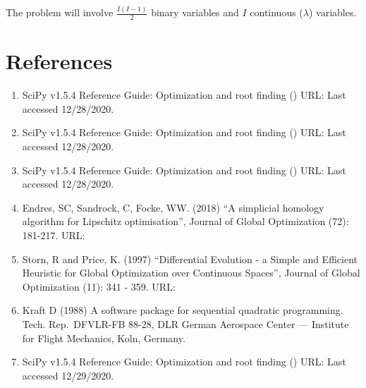 \documentclass[letterpaper,10pt,english]{sphinxmanual}
\begin{document}
The problem will involve \(\frac{I(I-1)}{2}\) binary variables and \(I\) continuous (\(\lambda\)) variables.


\section{References}
\label{\detokenize{optimizers:references}}\begin{enumerate}
\def\theenumi{\arabic{enumi}}
\def\labelenumi{\theenumi .}
\makeatletter\def\p@enumii{\p@enumi \theenumi .}\makeatother
\item {} 
 SciPy v1.5.4 Reference Guide: Optimization
and root finding () URL:
Last accessed 12/28/2020.

\item {} 
 SciPy v1.5.4 Reference
Guide: Optimization and root finding () URL:
Last accessed 12/28/2020.

\item {} 
 SciPy v1.5.4 Reference Guide:
Optimization and root finding () URL:
Last accessed 12/28/2020.

\item {} 
Endres, SC, Sandrock, C, Focke, WW. (2018) “A simplicial homology
algorithm for Lipschitz optimisation”, Journal of Global Optimization
(72): 181-217. URL:

\item {} 
Storn, R and Price, K. (1997) “Differential Evolution - a Simple and
Efficient Heuristic for Global Optimization over Continuous Spaces”,
Journal of Global Optimization (11): 341 - 359. URL:

\item {} 
Kraft D (1988) A software package for sequential quadratic
programming. Tech. Rep. DFVLR-FB 88-28, DLR German Aerospace Center —
Institute for Flight Mechanics, Koln, Germany.

\item {} 
 SciPy v1.5.4 Reference Guide:
Optimization and root finding () URL:
Last accessed 12/29/2020.

\end{enumerate}
\end{document}
